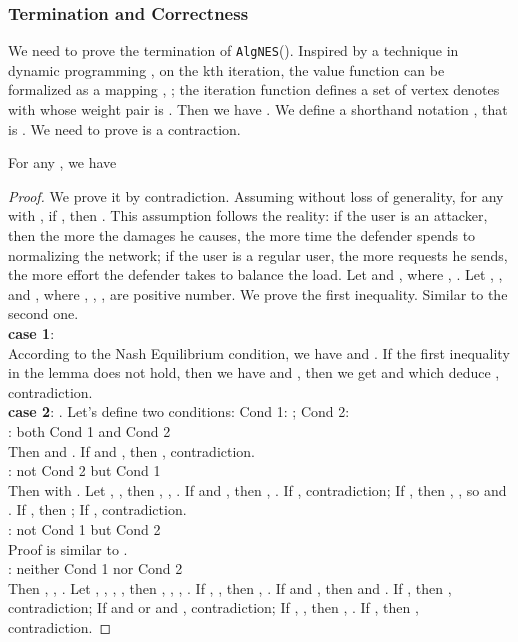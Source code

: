 \documentclass[10pt, conference, compsocconf]{IEEEtran}
\begin{document}
\subsubsection{Termination and Correctness}
We need to prove the termination of \verb"AlgNES"().
Inspired by a technique in dynamic programming \cite{vander}\cite{ls}, on the kth iteration, the value function can be formalized as a mapping , ; the iteration function defines a set of vertex  denotes  with  whose weight pair is .
Then we have . We define a shorthand notation , that is . We need to prove  is a contraction.
\begin{Lemma}
\label{provenesterminatedpre}
For any , we have


\end{Lemma}
\begin{proof}
We prove it by contradiction. Assuming without loss of generality, for any  with , if , then . This assumption follows the reality: if the user is an attacker, then the more the damages he causes, the more time the defender spends to normalizing the network; if the user is a regular user, the more requests he sends, the more effort the defender takes to balance the load. Let  and , where , .
Let , ,  and , where , , ,  are positive number. We prove the first inequality. Similar to the second one. \\
\textbf{case 1}: \\
According to the Nash Equilibrium condition, we have  and . If the first inequality in the lemma does not hold, then we have  and , then we get  and  which deduce , contradiction.\\
\textbf{case 2}: .
Let's define two conditions:
Cond 1: ;
Cond 2: \\
\textbf{}: both Cond 1 and Cond 2\\
Then  and . If  and , then , contradiction. \\
\textbf{}: not Cond 2 but Cond 1 \\
Then  with . Let , , then , , . If  and , then , . If , contradiction; If , then ,  , so  and . If , then ; If , contradiction. \\
\textbf{}: not Cond 1 but Cond 2\\
Proof is similar to \textbf{}.\\
\textbf{}: neither Cond 1 nor Cond 2\\
Then , , . Let , , , , then , , , . If , , then , . If  and , then  and . If , then , contradiction; If  and  or  and , contradiction; If , , then , . If , then , contradiction.
\end{proof}
\end{document}
